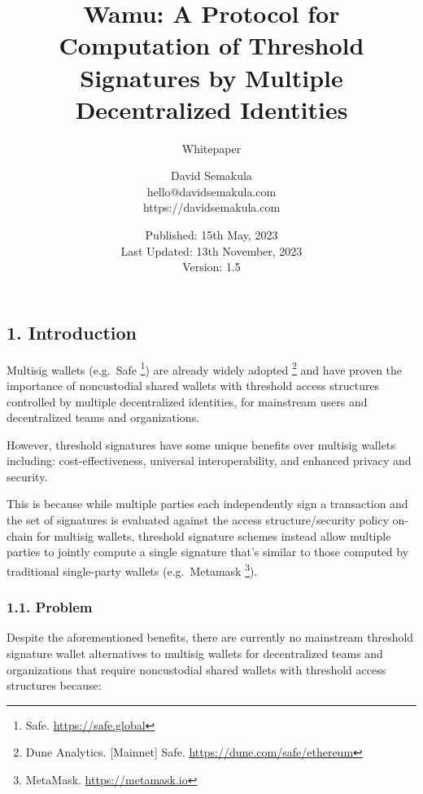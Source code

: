 \documentclass[
]{article}
\title{Wamu: A Protocol for Computation of Threshold Signatures by
Multiple Decentralized Identities}
\subtitle{Whitepaper}
\author{David Semakula\\
hello@davidsemakula.com\\
https://davidsemakula.com}
\date{Published: 15th May, 2023\\
Last Updated: 13th November, 2023\\
Version: 1.5}
\begin{document}
\maketitle

{
\setcounter{tocdepth}{3}
\tableofcontents
}
\hypertarget{introduction}{%
\subsection{1. Introduction}\label{introduction}}

Multisig wallets (e.g.~Safe \footnote{Safe. \url{https://safe.global}})
are already widely adopted \footnote{Dune Analytics. {[}Mainnet{]} Safe.
  \url{https://dune.com/safe/ethereum}} and have proven the importance
of noncustodial shared wallets with threshold access structures
controlled by multiple decentralized identities, for mainstream users
and decentralized teams and organizations.

However, threshold signatures have some unique benefits over multisig
wallets including: cost-effectiveness, universal interoperability, and
enhanced privacy and security.

This is because while multiple parties each independently sign a
transaction and the set of signatures is evaluated against the access
structure/security policy on-chain for multisig wallets, threshold
signature schemes instead allow multiple parties to jointly compute a
single signature that's similar to those computed by traditional
single-party wallets (e.g.~Metamask \footnote{MetaMask.
  \url{https://metamask.io}}).

\hypertarget{problem}{%
\subsubsection{1.1. Problem}\label{problem}}

Despite the aforementioned benefits, there are currently no mainstream
threshold signature wallet alternatives to multisig wallets for
decentralized teams and organizations that require noncustodial shared
wallets with threshold access structures because:
\end{document}

